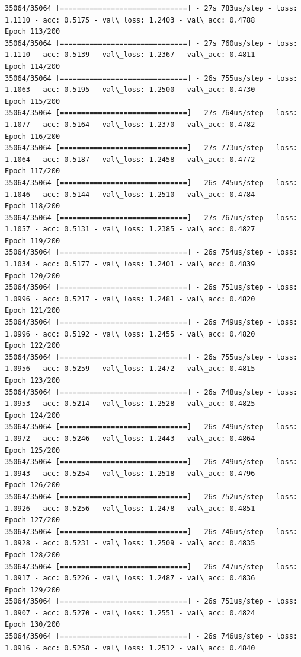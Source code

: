 \documentclass[11pt]{article}
\begin{document}
\begin{Verbatim}[commandchars=\\\{\}]
35064/35064 [==============================] - 27s 783us/step - loss: 1.1110 - acc: 0.5175 - val\_loss: 1.2403 - val\_acc: 0.4788
Epoch 113/200
35064/35064 [==============================] - 27s 760us/step - loss: 1.1110 - acc: 0.5139 - val\_loss: 1.2367 - val\_acc: 0.4811
Epoch 114/200
35064/35064 [==============================] - 26s 755us/step - loss: 1.1063 - acc: 0.5195 - val\_loss: 1.2500 - val\_acc: 0.4730
Epoch 115/200
35064/35064 [==============================] - 27s 764us/step - loss: 1.1077 - acc: 0.5164 - val\_loss: 1.2370 - val\_acc: 0.4782
Epoch 116/200
35064/35064 [==============================] - 27s 773us/step - loss: 1.1064 - acc: 0.5187 - val\_loss: 1.2458 - val\_acc: 0.4772
Epoch 117/200
35064/35064 [==============================] - 26s 745us/step - loss: 1.1046 - acc: 0.5144 - val\_loss: 1.2510 - val\_acc: 0.4784
Epoch 118/200
35064/35064 [==============================] - 27s 767us/step - loss: 1.1057 - acc: 0.5131 - val\_loss: 1.2385 - val\_acc: 0.4827
Epoch 119/200
35064/35064 [==============================] - 26s 754us/step - loss: 1.1034 - acc: 0.5177 - val\_loss: 1.2401 - val\_acc: 0.4839
Epoch 120/200
35064/35064 [==============================] - 26s 751us/step - loss: 1.0996 - acc: 0.5217 - val\_loss: 1.2481 - val\_acc: 0.4820
Epoch 121/200
35064/35064 [==============================] - 26s 749us/step - loss: 1.0996 - acc: 0.5192 - val\_loss: 1.2455 - val\_acc: 0.4820
Epoch 122/200
35064/35064 [==============================] - 26s 755us/step - loss: 1.0956 - acc: 0.5259 - val\_loss: 1.2472 - val\_acc: 0.4815
Epoch 123/200
35064/35064 [==============================] - 26s 748us/step - loss: 1.0953 - acc: 0.5214 - val\_loss: 1.2528 - val\_acc: 0.4825
Epoch 124/200
35064/35064 [==============================] - 26s 749us/step - loss: 1.0972 - acc: 0.5246 - val\_loss: 1.2443 - val\_acc: 0.4864
Epoch 125/200
35064/35064 [==============================] - 26s 749us/step - loss: 1.0943 - acc: 0.5254 - val\_loss: 1.2518 - val\_acc: 0.4796
Epoch 126/200
35064/35064 [==============================] - 26s 752us/step - loss: 1.0926 - acc: 0.5256 - val\_loss: 1.2478 - val\_acc: 0.4851
Epoch 127/200
35064/35064 [==============================] - 26s 746us/step - loss: 1.0928 - acc: 0.5231 - val\_loss: 1.2509 - val\_acc: 0.4835
Epoch 128/200
35064/35064 [==============================] - 26s 747us/step - loss: 1.0917 - acc: 0.5226 - val\_loss: 1.2487 - val\_acc: 0.4836
Epoch 129/200
35064/35064 [==============================] - 26s 751us/step - loss: 1.0907 - acc: 0.5270 - val\_loss: 1.2551 - val\_acc: 0.4824
Epoch 130/200
35064/35064 [==============================] - 26s 746us/step - loss: 1.0916 - acc: 0.5258 - val\_loss: 1.2512 - val\_acc: 0.4840

\end{Verbatim}
\end{document}
